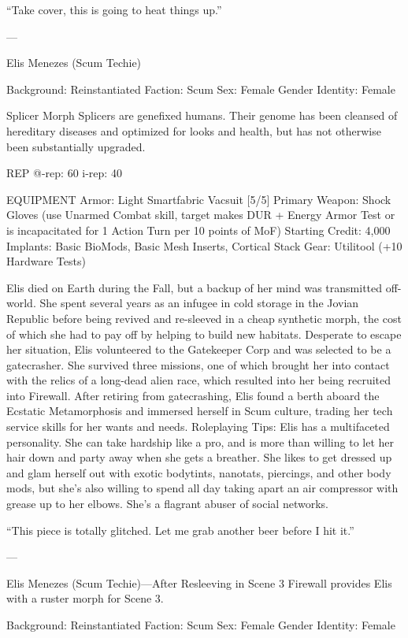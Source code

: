 “Take cover, this is going to heat things up.”

---

Elis Menezes (Scum Techie)

Background: Reinstantiated
Faction: Scum
Sex: Female
Gender Identity: Female

Splicer Morph
Splicers are genefixed humans. Their genome has been cleansed of hereditary diseases and optimized for looks and health, but has not otherwise been substantially upgraded.

REP
@-rep:	60
i-rep:	40

EQUIPMENT
Armor: Light Smartfabric Vacsuit [5/5]
Primary Weapon: Shock Gloves (use Unarmed Combat skill, target makes DUR + Energy Armor Test or is incapacitated for 1 Action Turn per 10 points of MoF)
Starting Credit: 4,000
Implants: Basic BioMods, Basic Mesh Inserts, Cortical Stack
Gear: Utilitool (+10 Hardware Tests)

Elis died on Earth during the Fall, but a backup of her mind was transmitted off-world. She spent several years as an infugee in cold storage in the Jovian Republic before being revived and re-sleeved in a cheap synthetic morph, the cost of which she had to pay off by helping to build new habitats. Desperate to escape her situation, Elis volunteered to the Gatekeeper Corp and was selected to be a gatecrasher. She survived three missions, one of which brought her into contact with the relics of a long-dead alien race, which resulted into her being recruited into Firewall. After retiring from gatecrashing, Elis found a berth aboard the Ecstatic Metamorphosis and immersed herself in Scum culture, trading her tech service skills for her wants and needs.
Roleplaying Tips: Elis has a multifaceted personality. She can take hardship like a pro, and is more than willing to let her hair down and party away when she gets a breather. She likes to get dressed up and glam herself out with exotic bodytints, nanotats, piercings, and other body mods, but she’s also willing to spend all day taking apart an air compressor with grease up to her elbows. She’s a flagrant abuser of social networks. 

“This piece is totally glitched. Let me grab another beer before I hit it.”

---

Elis Menezes (Scum Techie)—After Resleeving in Scene 3
Firewall provides Elis with a ruster morph for Scene 3.

Background: Reinstantiated
Faction: Scum
Sex: Female
Gender Identity: Female

